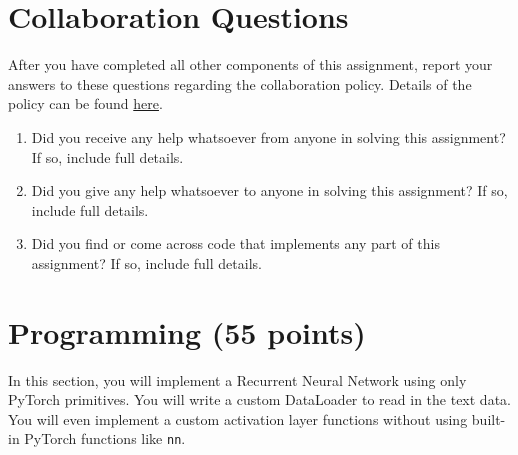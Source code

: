 \documentclass[11pt,addpoints,answers]{exam}
\begin{document}
\begin{questions}
\newpage
\end{questions}
\newpage
\section{Collaboration Questions}
After you have completed all other components of this assignment, report your answers to these questions regarding the collaboration policy. Details of the policy can be found \href{http://www.cs.cmu.edu/~mgormley/courses/10601/syllabus.html}{here}.
\begin{enumerate}
    \item Did you receive any help whatsoever from anyone in solving this assignment? If so, include full details.
    \item Did you give any help whatsoever to anyone in solving this assignment? If so, include full details.
    \item Did you find or come across code that implements any part of this assignment? If so, include full details.
\end{enumerate}

\begin{your_solution}[height=6cm]

\end{your_solution}

\newpage
\section{Programming (55 points)}
\label{programming}

In this section, you will implement a Recurrent Neural Network using only PyTorch primitives. You will write a custom DataLoader to read in the text data. You will even implement a custom activation layer functions without using built-in PyTorch functions like \texttt{nn}.
\end{document}
